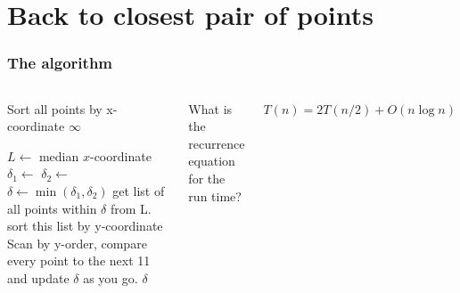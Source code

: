 \section{Back to closest pair of points}
\label{sec:back_to_closest_pair_of_points}


\begin{frame}
	\frametitle{The algorithm}
	\begin{columns}
	\begin{algorithmic}
		\State Sort all points by x-coordinate
				\State \Return $\infty$
			\EndIf

			\State $L \gets$ \alert<2>{median} $x$-coordinate
			\State $\delta_1 \gets$ 
			\State $\delta_2 \gets$ 
			\State $\delta \gets \min(\delta_1,\delta_2)$
			\State get list of all points within $\delta$ from L.
			\State sort this list by y-coordinate
			\State Scan by y-order, compare every point to the next 11 and update $\delta$ as you go.
			\State \Return $\delta$
		\EndFunction
	\end{algorithmic}
		\begin{questionblock}{}
			What is the recurrence equation for the run time?	
		\end{questionblock}	
		\begin{answerblock}{}
			\small
			$T(n) =2T(n/2) + O(n\log n)$	
		\end{answerblock}
	\end{columns}
	
\end{frame}

